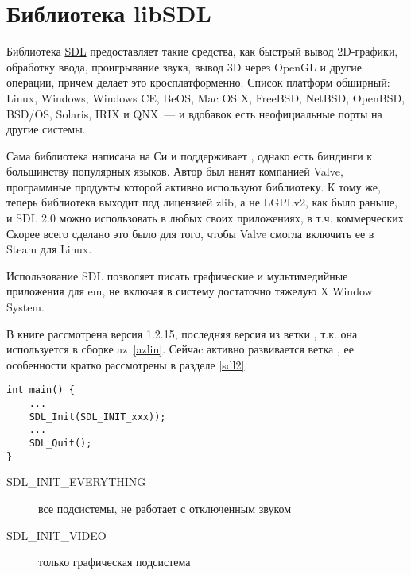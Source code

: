 \chapter{Библиотека libSDL}\secdown

Библиотека \href{http://www.libsdl.org/}{SDL} предоставляет такие средства, как
быстрый вывод 2D-графики, обработку ввода, проигрывание звука, вывод 3D через
OpenGL и другие операции, причем делает это кросплатформенно. Список платформ
обширный: Linux, Windows, Windows CE, BeOS, Mac OS X, FreeBSD, NetBSD, OpenBSD,
BSD/OS, Solaris, IRIX и QNX\ --- и вдобавок есть неофициальные порты на другие
системы.

Сама библиотека написана на Си и поддерживает \cpp, однако есть биндинги к
большинству популярных языков. Автор  был нанят компанией Valve,
программные продукты которой активно используют библиотеку. К тому же, теперь
библиотека выходит под лицензией zlib, а не LGPLv2, как было раньше, и SDL 2.0
можно использовать в любых своих приложениях, в т.ч. коммерческих Скорее всего
сделано это было для того, чтобы Valve смогла включить ее в Steam для Linux.

\bigskip
Использование SDL позволяет писать графические и мультимедийные приложения для
em\linux, не включая в систему достаточно тяжелую X Window System.

\bigskip
В книге рассмотрена версия 1.2.15, последняя версия из ветки , т.к.
она используется в сборке az\linux\ \ref{azlin}. Сейчаc активно развивается
ветка , ее особенности кратко рассмотрены в разделе \ref{sdl2}.


\begin{verbatim}
int main() {
	...
	SDL_Init(SDL_INIT_xxx));
	...
	SDL_Quit();
}
\end{verbatim}

\begin{description}
\item[SDL\_INIT\_EVERYTHING] все подсистемы, не работает с отключенным звуком
\item[SDL\_INIT\_VIDEO] только графическая подсистема
\end{description}

\secdown







































